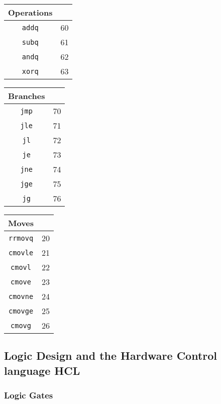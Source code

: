 \documentclass[10pt]{armath}
\newcommand{\s}[1]{\texttt{#1}}
\begin{document}
\begin{multicols}{3}
\begin{center}
  \begin{tabular}{c l}
    Operations & \\\hline
    \s{addq} & 60\\
    \s{subq} & 61\\
    \s{andq} & 62\\
    \s{xorq} & 63\\\hline
  \end{tabular}
\end{center}

\begin{center}
  \begin{tabular}{c l}
    Branches & \\\hline
    \s{jmp} & 70\\
    \s{jle} & 71\\
    \s{jl} & 72\\
    \s{je} & 73\\
    \s{jne} & 74\\
    \s{jge} & 75\\
    \s{jg} & 76\\\hline
  \end{tabular}
\end{center}

\begin{center}
  \begin{tabular}{c l}
    Moves & \\\hline
    \s{rrmovq} & 20\\
    \s{cmovle} & 21\\
    \s{cmovl} & 22\\
    \s{cmove} & 23\\
    \s{cmovne} & 24\\
    \s{cmovge} & 25\\
    \s{cmovg} & 26\\\hline
  \end{tabular}
\end{center}
\end{multicols}

\subsection{Logic Design and the Hardware Control language HCL}%
\label{sub:logic_design_and_the_hardware_control_language_hcl}

\subsubsection{Logic Gates}%
\label{ssub:logic_gates}
\end{document}
